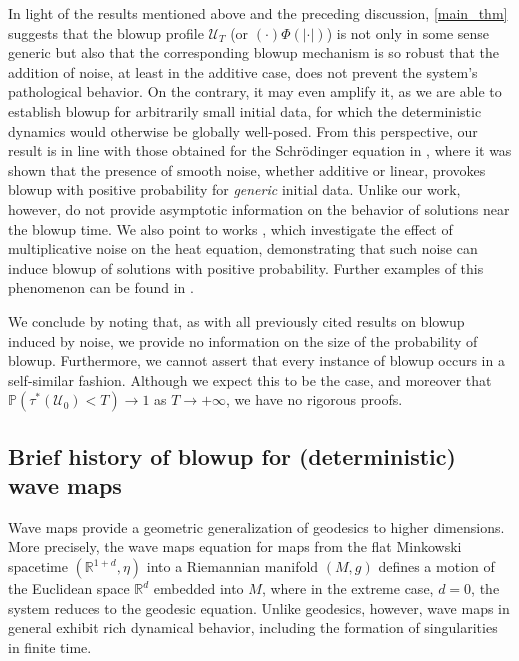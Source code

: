 \documentclass[12pt,reqno]{amsart}
\theoremstyle{plain}
\theoremstyle{remark}
\theoremstyle{plain}
\theoremstyle{definition}
\numberwithin{equation}{section}
\numberwithin{equation}{section}
\def\R{{\mathbb R}}
\begin{document}
	In light of the results mentioned above and the preceding discussion, \autoref{main_thm} suggests that the blowup profile $\mathcal{U}_T$ (or $(\cdot)\Phi(|\cdot|)$) is not only in some sense generic but also that the corresponding blowup mechanism is so robust that the addition of noise, at least in the additive case, does not prevent the system's pathological behavior. On the contrary, it may even amplify it, as we are able to establish blowup for arbitrarily small initial data, for which the deterministic dynamics would otherwise be globally well-posed. From this perspective, our result is in line with those obtained for the Schrödinger equation in \cite{de2002effect, debussche2005blow}, where it was shown that the presence of smooth noise, whether additive or linear, provokes blowup with positive probability for \emph{generic} initial data. Unlike our work, however, \cite{de2002effect, debussche2005blow} do not provide asymptotic information on the behavior of solutions near the blowup time. We also point to works \cite{mueller1993blowup, mueller2000critical}, which investigate the effect of multiplicative noise on the heat equation, demonstrating that such noise can induce blowup of solutions with positive probability. Further examples of this phenomenon can be found in \cite{foondun2015non, foondun2019some, foondun2024instantaneous, Hocq19}.
	
	We conclude by noting that, as with all previously cited results on blowup induced by noise, we provide no information on the size of the probability of blowup. Furthermore, we cannot assert that every instance of blowup occurs in a self-similar fashion. Although we expect this to be the case, and moreover that $\mathbb{P}\left(\tau^*(\boldsymbol{\mathcal{U}}_0)<T\right)\rightarrow 1$ as $T\rightarrow +\infty$, we have no rigorous proofs.
	
	\subsection{Brief history of blowup for (deterministic) wave maps} \label{Sec:History}  
	Wave maps provide a geometric generalization of geodesics to higher dimensions. More precisely, the wave maps equation for maps from the flat Minkowski spacetime $(\R^{1+d},\eta)$ into a Riemannian manifold $(M,g)$ defines a motion of the Euclidean space $\R^d$ embedded into $M$, where in the extreme case, $d=0$, the system reduces to the geodesic equation. Unlike geodesics, however, wave maps in general exhibit rich dynamical behavior, including the formation of singularities in finite time. 
	
\end{document}
